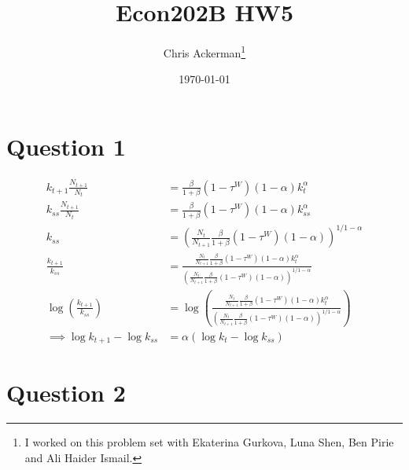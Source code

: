 \documentclass[11pt]{article}
\author{Chris Ackerman\thanks{I worked on this problem set with Ekaterina Gurkova, Luna Shen, Ben Pirie and Ali Haider Ismail.}}
\date{\today}
\title{Econ202B HW5}
\begin{document}
\maketitle
\tableofcontents

\newpage

\section{Question 1}
\label{sec:org7068860}
  \begin{align*}
k_{t + 1} \frac{N_{t + 1}}{N_t} &= \frac{\beta}{1 + \beta} (1 - \tau^W)(1 - \alpha) k_t^\alpha\\
k_{ss} \frac{N_{t + 1}}{N_t} &= \frac{\beta}{1 + \beta} (1 - \tau^W)(1 - \alpha) k_{ss}^\alpha\\
k_{ss} &= \left(\frac{N_t}{N_{t + 1}} \frac{\beta}{1 + \beta} (1 - \tau^W)(1 - \alpha)\right)^{1/1 - \alpha}\\
\frac{k_{t + 1}}{k_{ss}} &= \frac{\frac{N_t}{N_{t +  1}} \frac{\beta}{1 + \beta} (1 - \tau^W) (1 - \alpha) k_t^\alpha}{\left(\frac{N_t}{N_{t + 1}} \frac{\beta}{1 + \beta} (1 - \tau^W)(1 - \alpha)\right)^{1/1 - \alpha}}\\
\log\left(\frac{k_{t + 1}}{k_{ss}}\right) &= \log\left(\frac{\frac{N_t}{N_{t +  1}} \frac{\beta}{1 + \beta} (1 - \tau^W) (1 - \alpha) k_t^\alpha}{\left(\frac{N_t}{N_{t + 1}} \frac{\beta}{1 + \beta} (1 - \tau^W)(1 - \alpha)\right)^{1/1 - \alpha}}\right)\\
\implies \log k_{t + 1} - \log k_{ss} &= \alpha(\log k_t - \log k_{ss})
  \end{align*}

\newpage
\section{Question 2}
\label{sec:org203a2fd}
\end{document}
